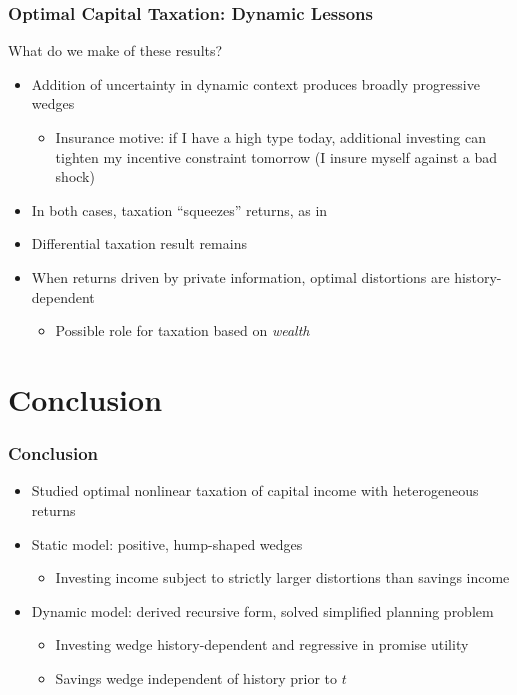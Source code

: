 \documentclass{beamer}
\begin{document}
\begin{frame}
    \frametitle{Optimal Capital Taxation: Dynamic Lessons}

    What do we make of these results? 
    \begin{itemize}
        \item Addition of uncertainty in dynamic context produces broadly progressive wedges
        \begin{itemize}
            \item Insurance motive: if I have a high type today, additional investing can tighten my incentive constraint tomorrow (I insure myself against a bad shock)
        \end{itemize}
        \item In both cases, taxation ``squeezes'' returns, as in \cite{farhi2010progressive} 
        \item Differential taxation result remains
        \item When returns driven by private information, optimal distortions are history-dependent 
        \begin{itemize}
            \item Possible role for taxation based on \textit{wealth}
        \end{itemize}
    \end{itemize}

\end{frame}


\section{Conclusion}
\begin{frame}
    \frametitle{Conclusion}

    \begin{itemize}
        \item Studied optimal nonlinear taxation of capital income with heterogeneous returns 
        \item Static model: positive, hump-shaped wedges 
        \begin{itemize}
            \item Investing income subject to strictly larger distortions than savings income 
        \end{itemize} 
        \item Dynamic model: derived recursive form, solved simplified planning problem 
        \begin{itemize}
            \item Investing wedge history-dependent and regressive in promise utility
            \item Savings wedge independent of history prior to \( t \) 
        \end{itemize}
    \end{itemize}

\end{frame}
\end{document}

